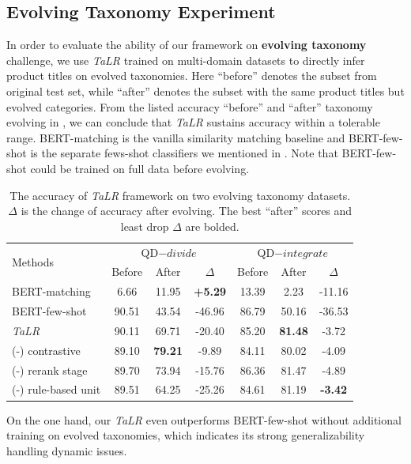 \subsection{Evolving Taxonomy Experiment}
\label{sec:evolve res}
In order to evaluate the ability of our framework on \textbf{evolving taxonomy} challenge, 
we use \textit{TaLR} trained on multi-domain datasets to directly infer product titles on evolved taxonomies.
Here ``before'' denotes the subset from original test set, while ``after'' denotes the subset with the same product titles but evolved categories.
From the listed accuracy ``before'' and ``after'' taxonomy evolving in , we can conclude that \textit{TaLR} sustains accuracy within a tolerable range.
BERT-matching is the vanilla similarity matching baseline and BERT-few-shot is the separate fews-shot classifiers we mentioned in . Note that BERT-few-shot could be trained on full data before evolving.


\begin{table}[th]
\setlength{\tabcolsep}{3pt}
  \begin{threeparttable}[b]
  \caption{The accuracy of \textit{TaLR} framework on two evolving taxonomy datasets. $\Delta$ is the change
  of accuracy after evolving. The best ``after'' scores and least drop $\Delta$ are bolded.}
  \label{tb:evolve}
  \centering
  \begin{tabular}{l|ccc|ccc}
    \toprule
    \multirow{2}{*}{Methods} & \multicolumn{3}{c|}{QD$-divide$} & \multicolumn{3}{c}{QD$-integrate$}\\
    \cline{2-7}
    & Before & After & $\Delta$ & Before & After & $\Delta$ \\
    \midrule
    BERT-matching & 6.66 & 11.95 & \textbf{+5.29} & 13.39 & 2.23 & -11.16\\
    BERT-few-shot & 90.51 & 43.54 & -46.96 & 86.79 & 50.16 & -36.53\\
    \midrule
    \textit{TaLR} & 90.11 & 69.71 & -20.40 & 85.20 & \textbf{81.48} & -3.72\\
    (-) contrastive  & 89.10 & \textbf{79.21} & -9.89 & 84.11 & 80.02 & -4.09\\
    (-) rerank stage & 89.70 & 73.94 & -15.76 & 86.36 & 81.47 & -4.89\\
    (-) rule-based unit & 89.51 & 64.25 & -25.26 & 84.61 & 81.19 & \textbf{-3.42}\\
    \bottomrule
  \end{tabular}
  \end{threeparttable}
\end{table}
On the one hand, our \textit{TaLR} even outperforms BERT-few-shot without additional training on evolved taxonomies, which indicates its strong generalizability handling dynamic issues.

